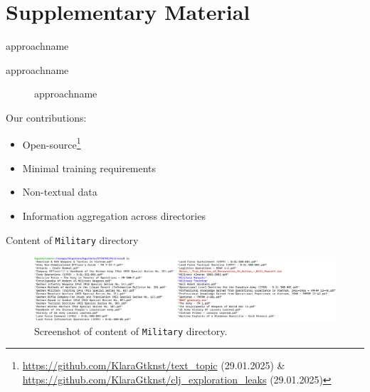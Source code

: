 \appendix
\section{Supplementary Material}

\begin{frame}{\acs{approachname}}
    \begin{description}
    \item[\acs{approachname}] \acl{approachname}
    \end{description}

    Our contributions:
    \begin{itemize}
        \item Open-source\footnote{\url{https://github.com/KlaraGtknst/text_topic} (29.01.2025) \&\\ \url{https://github.com/KlaraGtknst/clj_exploration_leaks} (29.01.2025)}
        \item Minimal training requirements
        \item Non-textual data
        \item Information aggregation across directories      
    \end{itemize}
\end{frame}

\begin{frame}{Content of \texttt{Military} directory}
    \begin{figure}
        \includegraphics[width=\textwidth]{images/data_screenshots/military.png}
        \caption{Screenshot of content of \texttt{Military} directory.}
        \label{fig:military_dir_content}
    \end{figure}
\end{frame}

